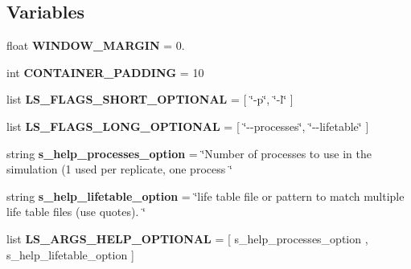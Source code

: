 \subsection*{Variables}
\begin{DoxyCompactItemize}
\item 
float {\bfseries W\+I\+N\+D\+O\+W\+\_\+\+M\+A\+R\+G\+IN} = 0.\hypertarget{namespacenegui_1_1negui_a9b4bed807593f13a45b32cad9ad03302}{}\label{namespacenegui_1_1negui_a9b4bed807593f13a45b32cad9ad03302}

\item 
int {\bfseries C\+O\+N\+T\+A\+I\+N\+E\+R\+\_\+\+P\+A\+D\+D\+I\+NG} = 10\hypertarget{namespacenegui_1_1negui_a697772153f0161816728f03911a53ed4}{}\label{namespacenegui_1_1negui_a697772153f0161816728f03911a53ed4}

\item 
list {\bfseries L\+S\+\_\+\+F\+L\+A\+G\+S\+\_\+\+S\+H\+O\+R\+T\+\_\+\+O\+P\+T\+I\+O\+N\+AL} = \mbox{[} \char`\"{}-\/p\char`\"{}, \char`\"{}-\/l\char`\"{} \mbox{]}\hypertarget{namespacenegui_1_1negui_ae53d15f57c250565845a17a425a90afa}{}\label{namespacenegui_1_1negui_ae53d15f57c250565845a17a425a90afa}

\item 
list {\bfseries L\+S\+\_\+\+F\+L\+A\+G\+S\+\_\+\+L\+O\+N\+G\+\_\+\+O\+P\+T\+I\+O\+N\+AL} = \mbox{[} \char`\"{}-\/-\/processes\char`\"{}, \char`\"{}-\/-\/lifetable\char`\"{} \mbox{]}\hypertarget{namespacenegui_1_1negui_a46e303892af9fa268c656af527ac1568}{}\label{namespacenegui_1_1negui_a46e303892af9fa268c656af527ac1568}

\item 
string {\bfseries s\+\_\+help\+\_\+processes\+\_\+option} = \char`\"{}Number of processes to use in the simulation (1 used per replicate, one process \char`\"{}\hypertarget{namespacenegui_1_1negui_aa0b1d5dce29751ae81f30927168edc3c}{}\label{namespacenegui_1_1negui_aa0b1d5dce29751ae81f30927168edc3c}

\item 
string {\bfseries s\+\_\+help\+\_\+lifetable\+\_\+option} = \char`\"{}life table file or pattern to match multiple life table files (use quotes). \char`\"{}\hypertarget{namespacenegui_1_1negui_afffa3d3a92fb8773a23551764f8f8eaa}{}\label{namespacenegui_1_1negui_afffa3d3a92fb8773a23551764f8f8eaa}

\item 
list {\bfseries L\+S\+\_\+\+A\+R\+G\+S\+\_\+\+H\+E\+L\+P\+\_\+\+O\+P\+T\+I\+O\+N\+AL} = \mbox{[} s\+\_\+help\+\_\+processes\+\_\+option , s\+\_\+help\+\_\+lifetable\+\_\+option \mbox{]}\hypertarget{namespacenegui_1_1negui_a212525736c85a79708529d797635af9e}{}\label{namespacenegui_1_1negui_a212525736c85a79708529d797635af9e}


\end{DoxyCompactItemize}
